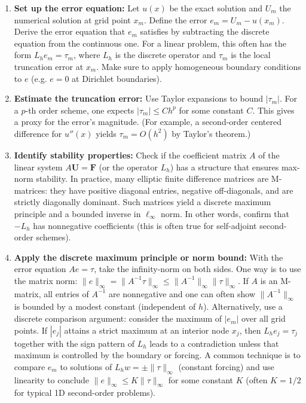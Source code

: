 \documentclass[a4paper,11pt]{report}
\begin{document}
\begin{enumerate}
    \item \textbf{Set up the error equation:} Let $u(x)$ be the exact solution and $U_m$ the numerical solution at grid point $x_m$. Define the error $e_m = U_m - u(x_m)$. Derive the error equation that $e_m$ satisfies by subtracting the discrete equation from the continuous one. For a linear problem, this often has the form $L_h e_m = \tau_m$, where $L_h$ is the discrete operator and $\tau_m$ is the local truncation error at $x_m$. Make sure to apply homogeneous boundary conditions to $e$ (e.g. $e=0$ at Dirichlet boundaries).

    \item \textbf{Estimate the truncation error:} Use Taylor expansions to bound $|\tau_m|$. For a $p$-th order scheme, one expects $|\tau_m| \leq Ch^p$ for some constant $C$. This gives a proxy for the error's magnitude. (For example, a second-order centered difference for $u''(x)$ yields $\tau_m = O(h^2)$ by Taylor's theorem.)

    \item \textbf{Identify stability properties:} Check if the coefficient matrix $A$ of the linear system $A \mathbf{U} = \mathbf{F}$ (or the operator $L_h$) has a structure that ensures max-norm stability. In practice, many elliptic finite difference matrices are M-matrices: they have positive diagonal entries, negative off-diagonals, and are strictly diagonally dominant. Such matrices yield a discrete maximum principle and a bounded inverse in $\ell_\infty$ norm. In other words, confirm that $-L_h$ has nonnegative coefficients (this is often true for self-adjoint second-order schemes).

    \item \textbf{Apply the discrete maximum principle or norm bound:} With the error equation $A e = \tau$, take the infinity-norm on both sides. One way is to use the matrix norm: $\|e\|_\infty = \|A^{-1}\tau\|_\infty \leq \|A^{-1}\|_\infty \|\tau\|_\infty$. If $A$ is an M-matrix, all entries of $A^{-1}$ are nonnegative and one can often show $\|A^{-1}\|_\infty$ is bounded by a modest constant (independent of $h$). Alternatively, use a discrete comparison argument: consider the maximum of $|e_m|$ over all grid points. If $|e_j|$ attains a strict maximum at an interior node $x_j$, then $L_h e_j = \tau_j$ together with the sign pattern of $L_h$ leads to a contradiction unless that maximum is controlled by the boundary or forcing. A common technique is to compare $e_m$ to solutions of $L_h w = \pm \|\tau\|_\infty$ (constant forcing) and use linearity to conclude $\|e\|_\infty \leq K\|\tau\|_\infty$ for some constant $K$ (often $K=1/2$ for typical 1D second-order problems).


\end{enumerate}
\end{document}
